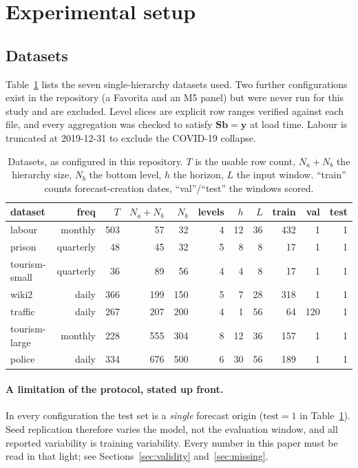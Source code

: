\documentclass[11pt]{article}
\newcommand{\Nb}{N_{b}}
\newcommand{\Na}{N_{a}}
\newcommand{\bvec}{\mathbf{b}}
\newcommand{\yvec}{\mathbf{y}}
\newcommand{\Smat}{\mathbf{S}}
\begin{document}
\section{Experimental setup}

\subsection{Datasets}
Table~\ref{tab:datasets} lists the seven single-hierarchy datasets used. Two further
configurations exist in the repository (a Favorita and an M5 panel) but were never
run for this study and are excluded. Level slices are explicit row ranges verified
against each file, and every aggregation was checked to satisfy
$\Smat \bvec = \yvec$ at load time. Labour is truncated at 2019-12-31 to exclude the
COVID-19 collapse.

\begin{table}[t]
\centering
\caption{Datasets, as configured in this repository. $T$ is the usable row count,
$\Na+\Nb$ the hierarchy size, $\Nb$ the bottom level, $h$ the horizon, $L$ the input
window. ``train'' counts forecast-creation dates, ``val''/``test'' the windows scored.}
\label{tab:datasets}
\small
\begin{tabular}{lrrrrrrrrrr}
\toprule
dataset & freq & $T$ & $\Na{+}\Nb$ & $\Nb$ & levels & $h$ & $L$ & train & val & test \\
\midrule
labour         & monthly   & 503 &  57 &  32 & 4 & 12 & 36 & 432 &   1 & 1 \\
prison         & quarterly &  48 &  45 &  32 & 5 &  8 &  8 &  17 &   1 & 1 \\
tourism-small  & quarterly &  36 &  89 &  56 & 4 &  4 &  8 &  17 &   1 & 1 \\
wiki2          & daily     & 366 & 199 & 150 & 5 &  7 & 28 & 318 &   1 & 1 \\
traffic        & daily     & 267 & 207 & 200 & 4 &  1 & 56 &  64 & 120 & 1 \\
tourism-large  & monthly   & 228 & 555 & 304 & 8 & 12 & 36 & 157 &   1 & 1 \\
police         & daily     & 334 & 676 & 500 & 6 & 30 & 56 & 189 &   1 & 1 \\
\bottomrule
\end{tabular}
\end{table}

\paragraph{A limitation of the protocol, stated up front.} In every configuration the
test set is a \emph{single} forecast origin ($\text{test}=1$ in
Table~\ref{tab:datasets}). Seed replication therefore varies the model, not the
evaluation window, and all reported variability is training variability. Every
number in this paper must be read in that light; see
Sections~\ref{sec:validity} and~\ref{sec:missing}.
\end{document}
